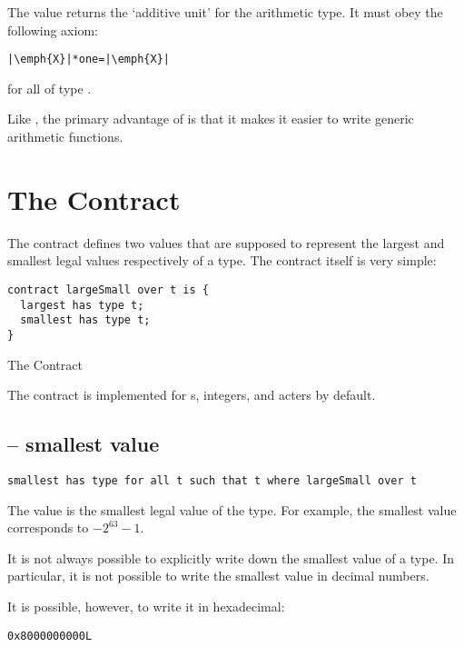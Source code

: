 The  value returns the `additive unit' for the arithmetic type.  It must obey the following axiom:

\begin{lstlisting}[escapechar=|]
|\emph{X}|*one=|\emph{X}|
\end{lstlisting}
for all  of type .

Like , the primary advantage of  is that it makes it easier to write generic arithmetic functions.

\section{The  Contract}
\label{largeSmall}
The  contract defines two values that are supposed to represent the largest and smallest legal values respectively of a type. The contract itself is very simple:
\begin{program}
\begin{lstlisting}
contract largeSmall over t is {
  largest has type t;
  smallest has type t;
}
\end{lstlisting}
\caption{The  Contract}\label{largeSmallProg}
\end{program}

The  contract is implemented for s,  integers,  and acters by default.

\subsection{ -- smallest value}
\begin{lstlisting}
smallest has type for all t such that t where largeSmall over t
\end{lstlisting}

The   value is the smallest legal value of the type. For example, the smallest  value corresponds to $-2^{63}-1$.

\begin{aside}
It is not always possible to explicitly write down the smallest value of a type. In particular, it is not possible to write the smallest  value in decimal numbers.
\begin{aside}
It is possible, however, to write it in hexadecimal:
\begin{lstlisting}
0x8000000000L
\end{lstlisting}
\end{aside}
\end{aside}

